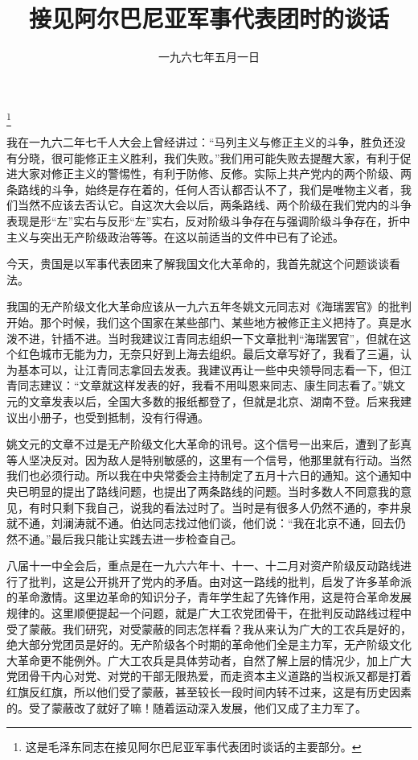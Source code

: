 
\title{接见阿尔巴尼亚军事代表团时的谈话}
\date{一九六七年五月一日}
\thanks{这是毛泽东同志在接见阿尔巴尼亚军事代表团时谈话的主要部分。}
\maketitle


我在一九六二年七千人大会上曾经讲过：“马列主义与修正主义的斗争，胜负还没有分晓，很可能修正主义胜利，我们失败。”我们用可能失败去提醒大家，有利于促进大家对修正主义的警惕性，有利于防修、反修。实际上共产党内的两个阶级、两条路线的斗争，始终是存在着的，任何人否认都否认不了，我们是唯物主义者，我们当然不应该去否认它。自这次大会以后，两条路线、两个阶级在我们党内的斗争表现是形“左”实右与反形“左”实右，反对阶级斗争存在与强调阶级斗争存在，折中主义与突出无产阶级政治等等。在这以前适当的文件中已有了论述。

今天，贵国是以军事代表团来了解我国文化大革命的，我首先就这个问题谈谈看法。

我国的无产阶级文化大革命应该从一九六五年冬姚文元同志对《海瑞罢官》的批判开始。那个时候，我们这个国家在某些部门、某些地方被修正主义把持了。真是水泼不进，针插不进。当时我建议江青同志组织一下文章批判“海瑞罢官”，但就在这个红色城市无能为力，无奈只好到上海去组织。最后文章写好了，我看了三遍，认为基本可以，让江青同志拿回去发表。我建议再让一些中央领导同志看一下，但江青同志建议：“文章就这样发表的好，我看不用叫恩来同志、康生同志看了。”姚文元的文章发表以后，全国大多数的报纸都登了，但就是北京、湖南不登。后来我建议出小册子，也受到抵制，没有行得通。

姚文元的文章不过是无产阶级文化大革命的讯号。这个信号一出来后，遭到了彭真等人坚决反对。因为敌人是特别敏感的，这里有一个信号，他那里就有行动。当然我们也必须行动。所以我在中央常委会主持制定了五月十六日的通知。这个通知中央已明显的提出了路线问题，也提出了两条路线的问题。当时多数人不同意我的意见，有时只剩下我自己，说我的看法过时了。当时是有很多人仍然不通的，李井泉就不通，刘澜涛就不通。伯达同志找过他们谈，他们说：“我在北京不通，回去仍然不通。”最后我只能让实践去进一步检查自己。

八届十一中全会后，重点是在一九六六年十、十一、十二月对资产阶级反动路线进行了批判，这是公开挑开了党内的矛盾。由对这一路线的批判，启发了许多革命派的革命激情。这里边革命的知识分子，青年学生起了先锋作用，这是符合革命发展规律的。这里顺便提起一个问题，就是广大工农党团骨干，在批判反动路线过程中受了蒙蔽。我们研究，对受蒙蔽的同志怎样看？我从来认为广大的工农兵是好的，绝大部分党团员是好的。无产阶级各个时期的革命他们全是主力军，无产阶级文化大革命更不能例外。广大工农兵是具体劳动者，自然了解上层的情况少，加上广大党团骨干内心对党、对党的干部无限热爱，而走资本主义道路的当权派又都是打着红旗反红旗，所以他们受了蒙蔽，甚至较长一段时间内转不过来，这是有历史因素的。受了蒙蔽改了就好了嘛！随着运动深入发展，他们又成了主力军了。

